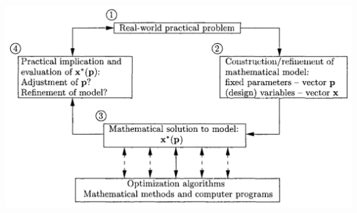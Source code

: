 \documentclass[11pt,a4paper,oneside]{article}
\newenvironment{Figure}		%
	{\par\medskip\noindent\minipage{\linewidth}}
	{\endminipage\par\medskip}
\begin{document}
\begin{Figure}
	\centering	
	\includegraphics[width=0.8\linewidth]{./Images/5-OptimisationModel}
	\label{fig:OptimisationModel}
\end{Figure}
\end{document}
